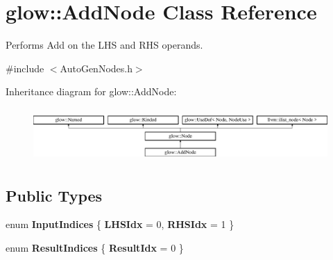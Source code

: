 \hypertarget{classglow_1_1_add_node}{}\section{glow\+:\+:Add\+Node Class Reference}
\label{classglow_1_1_add_node}


Performs Add on the L\+HS and R\+HS operands.  




{\ttfamily \#include $<$Auto\+Gen\+Nodes.\+h$>$}

Inheritance diagram for glow\+:\+:Add\+Node\+:\begin{figure}[H]
\begin{center}
\leavevmode
\includegraphics[height=2.028986cm]{classglow_1_1_add_node}
\end{center}
\end{figure}
\subsection*{Public Types}
\begin{DoxyCompactItemize}
\item 
\mbox{\label{classglow_1_1_add_node_a0eefa607c8ac4d2194eaf90b8f99aeaa}} 
enum {\bfseries Input\+Indices} \{ {\bfseries L\+H\+S\+Idx} = 0, 
{\bfseries R\+H\+S\+Idx} = 1
 \}
\item 
\mbox{\label{classglow_1_1_add_node_a5de3f43dace83ebd9ec1f79e2eeaf63c}} 
enum {\bfseries Result\+Indices} \{ {\bfseries Result\+Idx} = 0
 \}
\end{DoxyCompactItemize}
